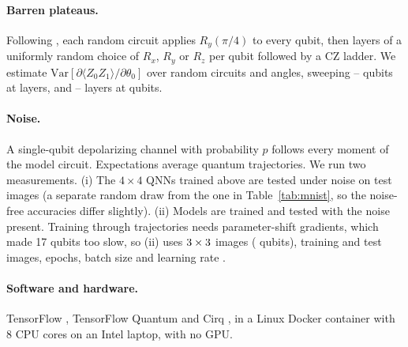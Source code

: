 \paragraph{Barren plateaus.}
Following \citet{mcclean2018barren}, each random circuit applies $R_y(\pi/4)$ to every qubit, then
layers of a uniformly random choice of $R_x$, $R_y$ or $R_z$ per qubit followed by a CZ ladder. We
estimate $\mathrm{Var}[\partial\langle Z_0Z_1\rangle/\partial\theta_0]$ over \valBpCircuits{} random
circuits and angles, sweeping \valBpMinQ--\valBpMaxQ{} qubits at \valBpFixedDepth{} layers, and
\valBpMinDepth--\valBpMaxDepth{} layers at \valBpFixedQubits{} qubits.

\paragraph{Noise.}
A single-qubit depolarizing channel with probability $p$ follows every moment of the model circuit.
Expectations average \valNoiseReps{} quantum trajectories. We run two measurements. (i) The
$4\times4$ QNNs trained above are tested under noise on \valNoiseEvalNTest{} test images (a separate
random draw from the one in Table~\ref{tab:mnist}, so the noise-free accuracies differ slightly). (ii) Models
are trained and tested with the noise present. Training through trajectories needs parameter-shift
gradients, which made 17 qubits too slow, so (ii) uses $3\times3$ images
(\valNoiseQubits{} qubits), \valNoiseNTrain{} training and \valNoiseNTest{} test images,
\valNoiseEpochs{} epochs, batch size \valNoiseBatch{} and learning rate \valNoiseLr{}.

\paragraph{Software and hardware.}
TensorFlow \valVerTF, TensorFlow Quantum \valVerTFQ{} and Cirq \valVerCirq, in a Linux Docker container
with 8 CPU cores on an Intel laptop, with no GPU.
